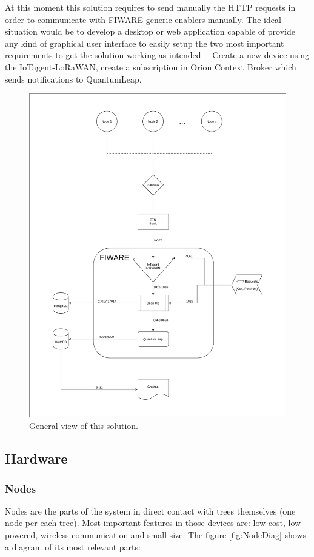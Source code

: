 \documentclass[11pt,a4paper,dvipsnames,twoside]{article}
\begin{document}
At this moment this solution requires to send manually the HTTP requests in order to communicate with FIWARE generic enablers manually. The ideal situation would be to develop a desktop or web application capable of provide any kind of graphical user interface to easily setup the two most important requirements to get the solution working as intended ---Create a new device using the IoTagent-LoRaWAN, create a subscription in Orion Context Broker which sends notifications to QuantumLeap.

\begin{figure}[htp]
  \centering
  \includegraphics[width=\textwidth]{../schemes/main_scheme_tbg.png}
  \caption{General view of this solution.}
  \label{fig:GenView}
\end{figure}

\subsection{Hardware}

\subsubsection{Nodes}
Nodes are the parts of the system in direct contact with trees themselves (one node per each tree). Most important features in those devices are: low-cost, low-powered, wireless communication and small size. The figure \ref{fig:NodeDiag} shows a diagram of its most relevant parts:
\end{document}
